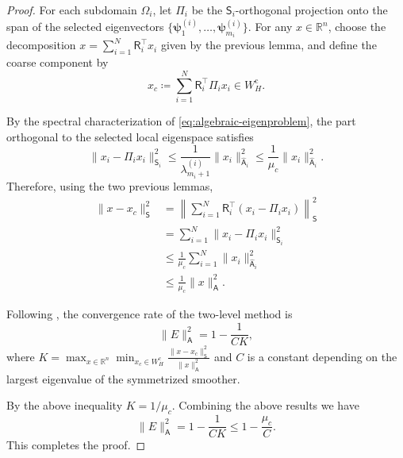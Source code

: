 \documentclass[preprint,12pt]{elsarticle}
\begin{document}
  \begin{proof}
    For each subdomain $\Omega_{i}$, let $\Pi_{i}$ be the $\mathsf{S}_{i}$-orthogonal
    projection onto the span of the selected eigenvectors
    $\{\boldsymbol{\psi}_{1}^{(i)}, \dots, \boldsymbol{\psi}_{m_i}^{(i)}\}$. For
    any $x \in \mathbb{R}^{n}$, choose the decomposition
    $x = \sum_{i=1}^{N}\mathsf{R}_{i}^{\intercal}x_{i}$ given by the previous
    lemma, and define the coarse component by
    \[
      x_{c}\coloneqq \sum_{i=1}^{N}\mathsf{R}_{i}^{\intercal}\Pi_{i}x_{i}\in W_{H}
      ^{\text{c}}.
    \]

    By the spectral characterization of \cref{eq:algebraic-eigenproblem}, the part
    orthogonal to the selected local eigenspace satisfies
    \[
      \|x_{i}- \Pi_{i}x_{i}\|_{\mathsf{S}_{i}}^{2}\le \frac{1}{\lambda_{m_i+1}^{(i)}}
      \|x_{i}\|_{\widehat{\mathsf{A}}_{i}}^{2}\le \frac{1}{\mu_{c}}\|x_{i}\|_{\widehat{\mathsf{A}}_{i}}
      ^{2}.
    \]
    Therefore, using the two previous lemmas,
    \begin{align*}
      \|x - x_{c}\|_{\mathsf{S}}^{2} & = \left\|\sum_{i=1}^{N}\mathsf{R}_{i}^{\intercal}(x_{i}- \Pi_{i}x_{i})\right\|_{\mathsf{S}}^{2} \\
                                     & = \sum_{i=1}^{N}\|x_{i}- \Pi_{i}x_{i}\|_{\mathsf{S}_{i}}^{2}                                    \\
                                     & \le \frac{1}{\mu_{c}}\sum_{i=1}^{N}\|x_{i}\|_{\widehat{\mathsf{A}}_{i}}^{2}                     \\
                                     & \le \frac{1}{\mu_{c}}\|x\|_{\mathsf{A}}^{2}.
    \end{align*}

    Following \cite{xu2017algebraic}, the convergence rate of the two-level method
    is
    \[
      \|E\|_{\mathsf{A}}^{2}= 1 - \frac{1}{CK},
    \]
    where $K = \max_{x \in \mathbb{R}^n}\min_{x_{c}\in W_{H}^{\text{c}}}\frac{\|x - x_{c}\|_{\mathsf{S}}^{2}}{\|x\|_{\mathsf{A}}^{2}}$ and $C$ is a constant depending on the largest eigenvalue of the symmetrized smoother.

    By the above inequality $K = 1/\mu_{c}$. Combining the above results we have
    \[
      \|E\|_{\mathsf{A}}^{2}= 1 - \frac{1}{CK}\le 1 - \frac{\mu_{c}}{C}.
    \]
    This completes the proof.
  \end{proof}
\end{document}
